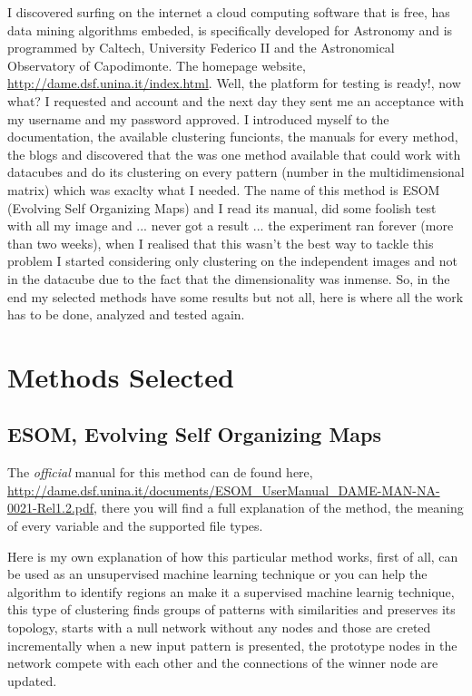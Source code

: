 \documentclass[11pt,fleqn]{book} %
\begin{document}
I discovered surfing on the internet a cloud computing software that is free, has data mining algorithms embeded, is specifically developed for Astronomy and is programmed by Caltech, University Federico II and the Astronomical Observatory of Capodimonte. The homepage website, \url{http://dame.dsf.unina.it/index.html}. Well, the platform for testing is ready!, now what? I requested and account and the next day they sent me an acceptance with my username and my password approved.
I introduced myself to the documentation, the available clustering funcionts, the manuals for every method, the blogs and discovered that the was one method available that could work with datacubes and do its clustering on every pattern (number in the multidimensional matrix) which was exaclty what I needed. The name of this method is ESOM (Evolving Self Organizing Maps) and I read its manual, did some foolish test with all my image and ... never got a result ... the experiment ran forever (more than two weeks), when I realised that this wasn't the best way to tackle this problem I started considering only clustering on the independent images and not in the datacube due to the fact that the dimensionality was inmense. So, in the end my selected methods have some results but not all, here is where all the work has to be done, analyzed and tested again.

\section{Methods Selected}

\subsection{ESOM, Evolving Self Organizing Maps}
The \emph{official} manual for this method can de found here, \url{http://dame.dsf.unina.it/documents/ESOM_UserManual_DAME-MAN-NA-0021-Rel1.2.pdf}, there you will find a full explanation of the method, the meaning of every variable and the supported file types.

Here is my own explanation of how this particular method works, first of all, can be used as an unsupervised machine learning technique or you can help the algorithm to identify regions an make it a supervised machine learnig technique, this type of clustering finds groups of patterns with similarities and preserves its topology, starts with a null network without any nodes and those are creted incrementally when a new input pattern is presented, the prototype nodes in the network compete with each other and the connections of the winner node are updated. 
\end{document}
